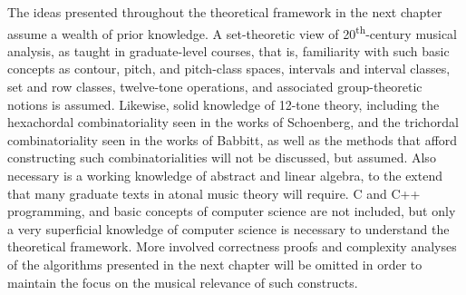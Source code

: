 The ideas presented throughout the theoretical framework in the next chapter assume a wealth of prior knowledge. A set-theoretic view of 20\textsuperscript{th}-century musical analysis, as taught in graduate-level courses, that is, familiarity with such basic concepts as contour, pitch, and pitch-class spaces, intervals and interval classes, set and row classes, twelve-tone operations, and associated group-theoretic notions is assumed. Likewise, solid knowledge of 12-tone theory, including the hexachordal combinatoriality seen in the works of Schoenberg, and the trichordal combinatoriality seen in the works of Babbitt, as well as the methods that afford constructing such combinatorialities will not be discussed, but assumed. Also necessary is a working knowledge of abstract and linear algebra, to the extend that many graduate texts in atonal music theory will require. C and C++ programming, and basic concepts of computer science are not included, but only a very superficial knowledge of computer science is necessary to understand the theoretical framework. More involved correctness proofs and complexity analyses of the algorithms presented in the next chapter will be omitted in order to maintain the focus on the musical relevance of such constructs.
